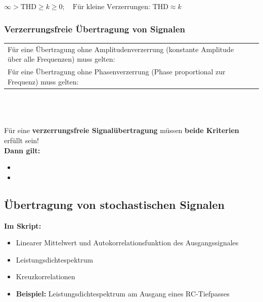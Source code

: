 			\begin{center}
				$\infty > \text{THD} \geq k \geq 0; \quad \text{Für kleine Verzerrungen: THD} \approx k $
			\end{center}

		
		\subsubsection{Verzerrungsfreie Übertragung von Signalen }
		
			\begin{tabularx}{\textwidth}{p{9cm}X}
				Für eine Übertragung ohne Amplitudenverzerrung \newline (konstante Amplitude über alle Frequenzen) muss gelten:
			&	$ $ \newline \fbox{$|H(j\omega)| = konstant$}
			\\
			Für eine Übertragung ohne Phasenverzerrung \newline (Phase proportional zur Frequenz) muss gelten:
			&	$ $ \newline \fbox{$\theta(\omega) = -\omega t_0$}
			\end{tabularx}\\
			\\ \\
			Für eine \textbf{verzerrungsfreie Signalübertragung} müssen \textbf{beide Kriterien} erfüllt sein!\\
			\textbf{Dann gilt:}
			\begin{itemize}
				\item {}
				\item {}
			\end{itemize}
		
		
	\subsection{Übertragung von stochastischen Signalen }
	
		\textbf{Im Skript:}
		\begin{itemize}
			\item Linearer Mittelwert und Autokorrelationsfunktion des Ausgangssignales 
			\item Leistungsdichtespektrum 
			\item Kreuzkorrelationen 
			\item \textbf{Beispiel:} Leistungsdichtespektrum am Ausgang eines RC-Tiefpasses 
		\end{itemize}
		
		
		
		
		
		
		